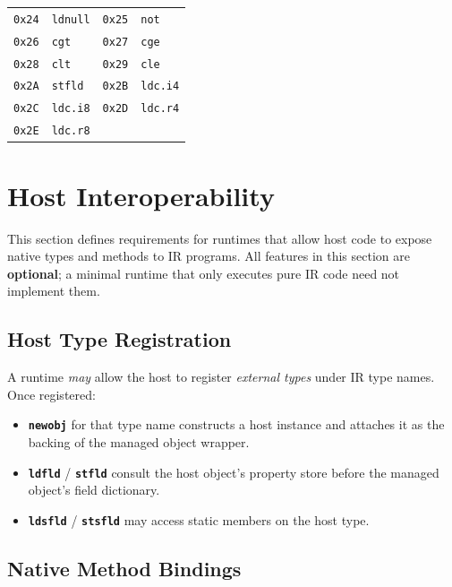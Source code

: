 \documentclass[11pt,a4paper]{article}
\newcommand{\opcode}[1]{\textbf{\texttt{#1}}}
\begin{document}
\begin{longtable}{llll}
  \texttt{0x24} & \texttt{ldnull}    & \texttt{0x25} & \texttt{not}      \\
  \texttt{0x26} & \texttt{cgt}       & \texttt{0x27} & \texttt{cge}      \\
  \texttt{0x28} & \texttt{clt}       & \texttt{0x29} & \texttt{cle}      \\
  \texttt{0x2A} & \texttt{stfld}     & \texttt{0x2B} & \texttt{ldc.i4}   \\
  \texttt{0x2C} & \texttt{ldc.i8}    & \texttt{0x2D} & \texttt{ldc.r4}   \\
  \texttt{0x2E} & \texttt{ldc.r8}    &               &                   \\
  \bottomrule
\end{longtable}

\section{Host Interoperability}
\label{sec:hostinterop}

This section defines requirements for runtimes that allow host code to
expose native types and methods to IR programs. All features in this section
are \textbf{optional}; a minimal runtime that only executes pure IR code
need not implement them.

\subsection{Host Type Registration}

A runtime \textit{may} allow the host to register \emph{external types}
under IR type names. Once registered:

\begin{itemize}[leftmargin=1.8em]
  \item \opcode{newobj} for that type name constructs a host instance and
    attaches it as the backing of the managed object wrapper.
  \item \opcode{ldfld} / \opcode{stfld} consult the host object's property
    store before the managed object's field dictionary.
  \item \opcode{ldsfld} / \opcode{stsfld} may access static members on the
    host type.
\end{itemize}

\subsection{Native Method Bindings}
\end{document}

